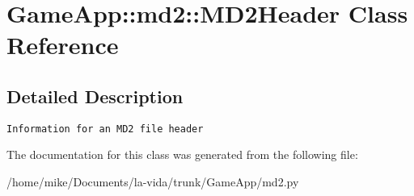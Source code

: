 \hypertarget{classGameApp_1_1md2_1_1MD2Header}{
\section{GameApp::md2::MD2Header Class Reference}
\label{classGameApp_1_1md2_1_1MD2Header}
}


\subsection{Detailed Description}


\footnotesize\begin{verbatim}Information for an MD2 file header \end{verbatim}
\normalsize
 

The documentation for this class was generated from the following file:\begin{CompactItemize}
\item 
/home/mike/Documents/la-vida/trunk/GameApp/md2.py\end{CompactItemize}

